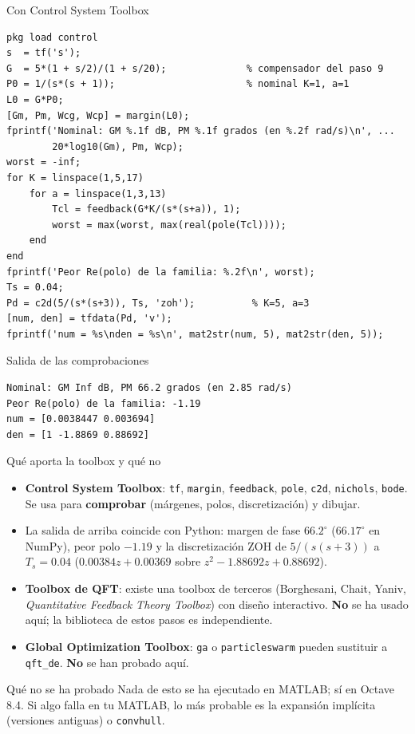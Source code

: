 \documentclass[aspectratio=169,11pt]{beamer}
\begin{document}
\begin{frame}[fragile]{Con Control System Toolbox}
\scriptsize
\begin{verbatim}
pkg load control
s  = tf('s');
G  = 5*(1 + s/2)/(1 + s/20);              % compensador del paso 9
P0 = 1/(s*(s + 1));                       % nominal K=1, a=1
L0 = G*P0;
[Gm, Pm, Wcg, Wcp] = margin(L0);
fprintf('Nominal: GM %.1f dB, PM %.1f grados (en %.2f rad/s)\n', ...
        20*log10(Gm), Pm, Wcp);
worst = -inf;
for K = linspace(1,5,17)
    for a = linspace(1,3,13)
        Tcl = feedback(G*K/(s*(s+a)), 1);
        worst = max(worst, max(real(pole(Tcl))));
    end
end
fprintf('Peor Re(polo) de la familia: %.2f\n', worst);
Ts = 0.04;
Pd = c2d(5/(s*(s+3)), Ts, 'zoh');          % K=5, a=3
[num, den] = tfdata(Pd, 'v');
fprintf('num = %s\nden = %s\n', mat2str(num, 5), mat2str(den, 5));
\end{verbatim}
\end{frame}

\begin{frame}[fragile]{Salida de las comprobaciones}
\footnotesize\begin{verbatim}
Nominal: GM Inf dB, PM 66.2 grados (en 2.85 rad/s)
Peor Re(polo) de la familia: -1.19
num = [0.0038447 0.003694]
den = [1 -1.8869 0.88692]
\end{verbatim}
\end{frame}

\begin{frame}{Qué aporta la toolbox y qué no}
  \small
  \begin{itemize}
    \item \textbf{Control System Toolbox}: \texttt{tf}, \texttt{margin}, \texttt{feedback}, \texttt{pole}, \texttt{c2d}, \texttt{nichols}, \texttt{bode}. Se usa para \textbf{comprobar} (márgenes, polos, discretización) y dibujar.
    \item La salida de arriba coincide con Python: margen de fase $66.2^\circ$ ($66.17^\circ$ en NumPy), peor polo $-1.19$ y la discretización ZOH de $5/(s(s+3))$ a $T_s=0.04$ ($0.00384z+0.00369$ sobre $z^2-1.88692z+0.88692$).
    \item \textbf{Toolbox de QFT}: existe una toolbox de terceros (Borghesani, Chait, Yaniv, \emph{Quantitative Feedback Theory Toolbox}) con diseño interactivo. \textbf{No} se ha usado aquí; la biblioteca de estos pasos es independiente.
    \item \textbf{Global Optimization Toolbox}: \texttt{ga} o \texttt{particleswarm} pueden sustituir a \texttt{qft\_de}. \textbf{No} se han probado aquí.
  \end{itemize}
  \begin{alertblock}{Qué no se ha probado}
    Nada de esto se ha ejecutado en MATLAB; sí en Octave 8.4. Si algo falla en tu MATLAB, lo más probable es la expansión implícita (versiones antiguas) o \texttt{convhull}.
  \end{alertblock}
\end{frame}
\end{document}

